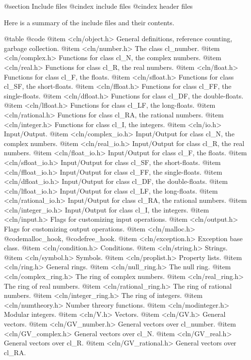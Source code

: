 @section Include files
@cindex include files
@cindex header files

Here is a summary of the include files and their contents.

@table @code
@item <cln/object.h>
General definitions, reference counting, garbage collection.
@item <cln/number.h>
The class cl_number.
@item <cln/complex.h>
Functions for class cl_N, the complex numbers.
@item <cln/real.h>
Functions for class cl_R, the real numbers.
@item <cln/float.h>
Functions for class cl_F, the floats.
@item <cln/sfloat.h>
Functions for class cl_SF, the short-floats.
@item <cln/ffloat.h>
Functions for class cl_FF, the single-floats.
@item <cln/dfloat.h>
Functions for class cl_DF, the double-floats.
@item <cln/lfloat.h>
Functions for class cl_LF, the long-floats.
@item <cln/rational.h>
Functions for class cl_RA, the rational numbers.
@item <cln/integer.h>
Functions for class cl_I, the integers.
@item <cln/io.h>
Input/Output.
@item <cln/complex_io.h>
Input/Output for class cl_N, the complex numbers.
@item <cln/real_io.h>
Input/Output for class cl_R, the real numbers.
@item <cln/float_io.h>
Input/Output for class cl_F, the floats.
@item <cln/sfloat_io.h>
Input/Output for class cl_SF, the short-floats.
@item <cln/ffloat_io.h>
Input/Output for class cl_FF, the single-floats.
@item <cln/dfloat_io.h>
Input/Output for class cl_DF, the double-floats.
@item <cln/lfloat_io.h>
Input/Output for class cl_LF, the long-floats.
@item <cln/rational_io.h>
Input/Output for class cl_RA, the rational numbers.
@item <cln/integer_io.h>
Input/Output for class cl_I, the integers.
@item <cln/input.h>
Flags for customizing input operations.
@item <cln/output.h>
Flags for customizing output operations.
@item <cln/malloc.h>
@code{malloc_hook}, @code{free_hook}.
@item <cln/exception.h>
Exception base class.
@item <cln/condition.h>
Conditions.
@item <cln/string.h>
Strings.
@item <cln/symbol.h>
Symbols.
@item <cln/proplist.h>
Property lists.
@item <cln/ring.h>
General rings.
@item <cln/null_ring.h>
The null ring.
@item <cln/complex_ring.h>
The ring of complex numbers.
@item <cln/real_ring.h>
The ring of real numbers.
@item <cln/rational_ring.h>
The ring of rational numbers.
@item <cln/integer_ring.h>
The ring of integers.
@item <cln/numtheory.h>
Number threory functions.
@item <cln/modinteger.h>
Modular integers.
@item <cln/V.h>
Vectors.
@item <cln/GV.h>
General vectors.
@item <cln/GV_number.h>
General vectors over cl_number.
@item <cln/GV_complex.h>
General vectors over cl_N.
@item <cln/GV_real.h>
General vectors over cl_R.
@item <cln/GV_rational.h>
General vectors over cl_RA.
